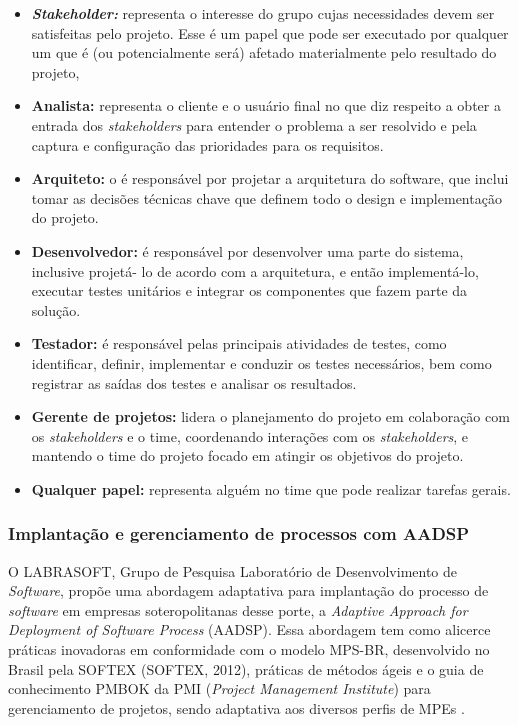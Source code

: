 \documentclass{acm_proc_article-sp}
\begin{document}
\begin{itemize}
\item \textbf{\textit{Stakeholder:}} representa o interesse do grupo cujas necessidades devem ser satisfeitas
pelo projeto. Esse é um papel que pode ser executado por qualquer um que é (ou
potencialmente será) afetado materialmente pelo resultado do projeto,
\item \textbf{Analista:}  representa o cliente e o usuário final no que diz respeito a obter a entrada
dos \textit{stakeholders} para entender o problema a ser resolvido e pela captura e
configuração das prioridades para os requisitos.
\item \textbf{Arquiteto:} o é responsável por projetar a arquitetura do software, que inclui tomar as
decisões técnicas chave que definem todo o design e implementação do projeto.
\item \textbf{Desenvolvedor:} é responsável por desenvolver uma parte do sistema, inclusive projetá-
lo de acordo com a arquitetura, e então implementá-lo, executar testes unitários e
integrar os componentes que fazem parte da solução.
\item \textbf{Testador:} é responsável pelas principais atividades de testes, como identificar, definir,
implementar e conduzir os testes necessários, bem como registrar as saídas dos testes
e analisar os resultados.
\item \textbf{Gerente de projetos:} lidera o planejamento do projeto em colaboração com os
\textit{stakeholders} e o time, coordenando interações com os \textit{stakeholders}, e mantendo o
time do projeto focado em atingir os objetivos do projeto.
\item \textbf{Qualquer papel:} representa alguém no time que pode realizar tarefas gerais.
\end{itemize}

\subsubsection{Implantação e gerenciamento de processos com AADSP}
O LABRASOFT, Grupo de Pesquisa Laboratório de Desenvolvimento de \textit{Software}, propõe uma abordagem adaptativa para implantação do processo de \textit{software} em empresas soteropolitanas desse porte, a \textit{Adaptive Approach for Deployment of Software Process} (AADSP). Essa abordagem tem como alicerce práticas inovadoras em conformidade com o modelo MPS-BR, desenvolvido no Brasil pela SOFTEX (SOFTEX, 2012), práticas de métodos ágeis e o guia de conhecimento PMBOK da PMI (\textit{Project Management Institute}) para gerenciamento de projetos, sendo adaptativa aos diversos perfis de MPEs \cite{aadsp:hibirdo}. 
\end{document}
